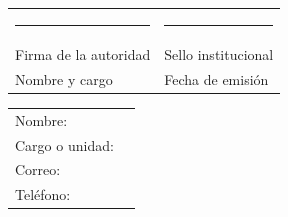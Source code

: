 \documentclass[11pt,a4paper]{article}
\begin{document}
\vspace{1.25cm}
\noindent\begin{tabularx}{\textwidth}{Y Y}
\centering\rule{6.4cm}{0.4pt} & \centering\arraybackslash\rule{6.4cm}{0.4pt}\\
\centering Firma de la autoridad & \centering\arraybackslash Sello institucional\\[1.15cm]
\centering Nombre y cargo & \centering\arraybackslash Fecha de emisión
\end{tabularx}

\vspace{0.65cm}
\begin{InfoBox}
\noindent\begin{tabularx}{\linewidth}{L{4.2cm} Y}
Nombre: & \hrulefill\\
Cargo o unidad: & \hrulefill\\
Correo: & \hrulefill\\
Teléfono: & \hrulefill\\
\end{tabularx}
\end{InfoBox}
\end{document}
